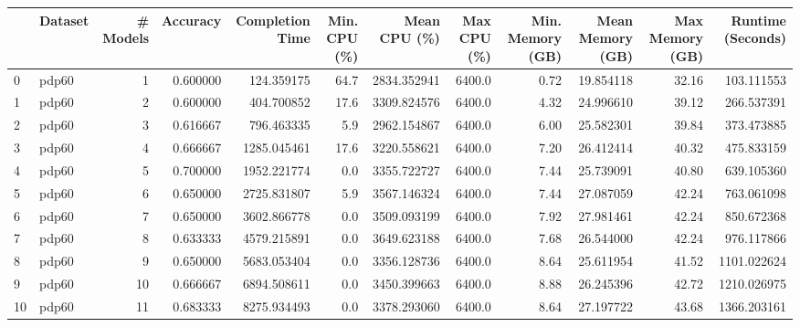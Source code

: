 \begin{tabular}{llrrrrrrrrrr}
\toprule
{} & Dataset &  \# Models &  Accuracy &  Completion Time &  Min. CPU (\%) &  Mean CPU (\%) &  Max CPU (\%) &  Min. Memory (GB) &  Mean Memory (GB) &  Max Memory (GB) &  Runtime (Seconds) \\
\midrule
0  &   pdp60 &         1 &  0.600000 &       124.359175 &          64.7 &   2834.352941 &       6400.0 &              0.72 &         19.854118 &            32.16 &         103.111553 \\
1  &   pdp60 &         2 &  0.600000 &       404.700852 &          17.6 &   3309.824576 &       6400.0 &              4.32 &         24.996610 &            39.12 &         266.537391 \\
2  &   pdp60 &         3 &  0.616667 &       796.463335 &           5.9 &   2962.154867 &       6400.0 &              6.00 &         25.582301 &            39.84 &         373.473885 \\
3  &   pdp60 &         4 &  0.666667 &      1285.045461 &          17.6 &   3220.558621 &       6400.0 &              7.20 &         26.412414 &            40.32 &         475.833159 \\
4  &   pdp60 &         5 &  0.700000 &      1952.221774 &           0.0 &   3355.722727 &       6400.0 &              7.44 &         25.739091 &            40.80 &         639.105360 \\
5  &   pdp60 &         6 &  0.650000 &      2725.831807 &           5.9 &   3567.146324 &       6400.0 &              7.44 &         27.087059 &            42.24 &         763.061098 \\
6  &   pdp60 &         7 &  0.650000 &      3602.866778 &           0.0 &   3509.093199 &       6400.0 &              7.92 &         27.981461 &            42.24 &         850.672368 \\
7  &   pdp60 &         8 &  0.633333 &      4579.215891 &           0.0 &   3649.623188 &       6400.0 &              7.68 &         26.544000 &            42.24 &         976.117866 \\
8  &   pdp60 &         9 &  0.650000 &      5683.053404 &           0.0 &   3356.128736 &       6400.0 &              8.64 &         25.611954 &            41.52 &        1101.022624 \\
9  &   pdp60 &        10 &  0.666667 &      6894.508611 &           0.0 &   3450.399663 &       6400.0 &              8.88 &         26.245396 &            42.72 &        1210.026975 \\
10 &   pdp60 &        11 &  0.683333 &      8275.934493 &           0.0 &   3378.293060 &       6400.0 &              8.64 &         27.197722 &            43.68 &        1366.203161 \\

\end{tabular}
